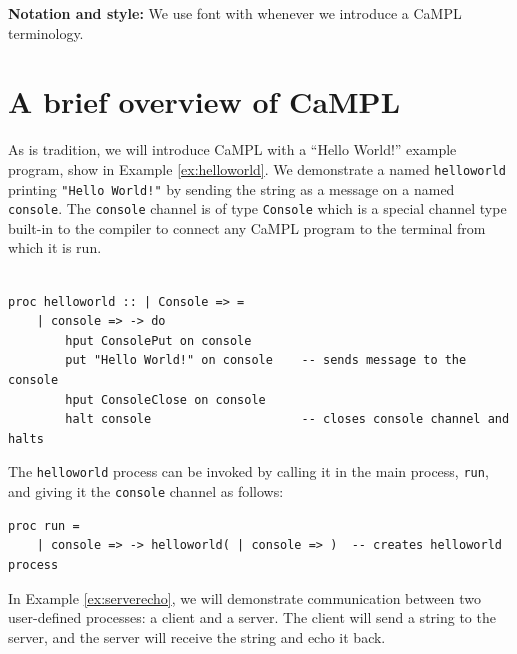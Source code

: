 \documentclass[11pt]{article}
\begin{document}

{\bf Notation and style:} We use font with  whenever we introduce a CaMPL terminology. 

\section{A brief overview of CaMPL}

As is tradition, we will introduce CaMPL with a ``Hello World!'' example program, show in Example \ref{ex:helloworld}.
We demonstrate a  named \lstinline$helloworld$ printing \lstinline$"Hello World!"$ by sending the string as a message on a  named \lstinline$console$. 
The \lstinline$console$ channel is of type \lstinline$Console$ which is a special channel type built-in to the compiler to connect any CaMPL program to the terminal from which it is run.
\begin{lstlisting}[label=ex:helloworld, caption=Hello World!] %can we change listing so that it says Example insted of Listing in the caption?

proc helloworld :: | Console => = 
	| console => -> do
		hput ConsolePut on console
		put "Hello World!" on console    -- sends message to the console       
		hput ConsoleClose on console
		halt console                     -- closes console channel and halts               
\end{lstlisting}
The \lstinline$helloworld$ process can be invoked by calling it in the main process, \lstinline$run$, and giving it the \lstinline$console$ channel as follows:
\begin{lstlisting}
proc run = 
	| console => -> helloworld( | console => )  -- creates helloworld process
\end{lstlisting}

In Example \ref{ex:serverecho}, we will demonstrate communication between two user-defined processes: a client and a server. 
The client will send a string to the server, and the server will receive the string and echo it back.
\end{document}
